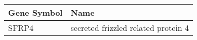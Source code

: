 \begin{tabular}{ll}
\toprule
Gene Symbol &                                Name \\
\midrule
      SFRP4 & secreted frizzled related protein 4 \\
\bottomrule
\end{tabular}
